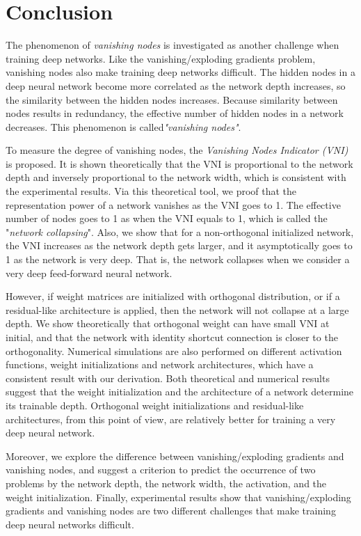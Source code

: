 \chapter{Conclusion} \label{conclusion}

The phenomenon of \textit{vanishing nodes} 
is investigated as another challenge when training deep networks.
Like the vanishing/exploding gradients problem, vanishing nodes also make training deep networks
difficult.
The hidden nodes in a deep neural network become more correlated as the network depth increases,
so the similarity between the hidden nodes increases.
Because similarity between nodes results in redundancy, the effective number of hidden nodes in a
network decreases.
This phenomenon is called\textit{"vanishing nodes"}.

To measure the degree of vanishing nodes, the \textit{Vanishing Nodes Indicator (VNI)} is proposed.
It is shown theoretically that the VNI is proportional to the network depth and inversely proportional
to the network width, which is consistent with the experimental results.
Via this theoretical tool,
we proof that the representation power of a network vanishes as the VNI goes to 1.
The effective number of nodes goes to 1 as when the VNI equals to 1, which is called
the "\textit{network collapsing}".
Also, we show that for a non-orthogonal initialized network, the VNI increases as the network
depth gets larger, and it asymptotically goes to 1 as the network is very deep.
That is, the network collapses when we consider a very deep feed-forward neural network.

However, if weight matrices are initialized with orthogonal distribution, or if a residual-like
architecture is applied, then the network will not collapse at a large depth.
We show theoretically that orthogonal weight can have small VNI at initial, and that
the network with identity shortcut connection is closer to the orthogonality.
Numerical simulations are also performed on different activation functions, weight initializations
and network architectures, which have a consistent result with our derivation.
Both theoretical and numerical results suggest that the weight initialization and the architecture
of a network determine its trainable depth.
Orthogonal weight initializations and residual-like architectures, from this point of view, are
relatively better for training a very deep neural network.

Moreover, we explore the difference between vanishing/exploding gradients and vanishing nodes,
and suggest a criterion to predict the occurrence of two problems by the network depth,
the network width, the activation, and the weight initialization. 
Finally, experimental results show that vanishing/exploding gradients and vanishing nodes are two
different challenges that make training deep neural networks difficult. 

